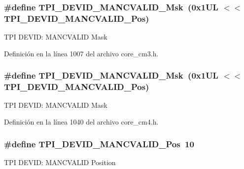 \subsubsection[{\texorpdfstring{T\+P\+I\+\_\+\+D\+E\+V\+I\+D\+\_\+\+M\+A\+N\+C\+V\+A\+L\+I\+D\+\_\+\+Msk}{TPI_DEVID_MANCVALID_Msk}}]{\setlength{\rightskip}{0pt plus 5cm}\#define T\+P\+I\+\_\+\+D\+E\+V\+I\+D\+\_\+\+M\+A\+N\+C\+V\+A\+L\+I\+D\+\_\+\+Msk~(0x1\+U\+L $<$$<$ T\+P\+I\+\_\+\+D\+E\+V\+I\+D\+\_\+\+M\+A\+N\+C\+V\+A\+L\+I\+D\+\_\+\+Pos)}\hypertarget{group___c_m_s_i_s___t_p_i_ga4c3ee4b1a34ad1960a6b2d6e7e0ff942}{}\label{group___c_m_s_i_s___t_p_i_ga4c3ee4b1a34ad1960a6b2d6e7e0ff942}
T\+PI D\+E\+V\+ID\+: M\+A\+N\+C\+V\+A\+L\+ID Mask 

Definición en la línea 1007 del archivo core\+\_\+cm3.\+h.

\subsubsection[{\texorpdfstring{T\+P\+I\+\_\+\+D\+E\+V\+I\+D\+\_\+\+M\+A\+N\+C\+V\+A\+L\+I\+D\+\_\+\+Msk}{TPI_DEVID_MANCVALID_Msk}}]{\setlength{\rightskip}{0pt plus 5cm}\#define T\+P\+I\+\_\+\+D\+E\+V\+I\+D\+\_\+\+M\+A\+N\+C\+V\+A\+L\+I\+D\+\_\+\+Msk~(0x1\+U\+L $<$$<$ T\+P\+I\+\_\+\+D\+E\+V\+I\+D\+\_\+\+M\+A\+N\+C\+V\+A\+L\+I\+D\+\_\+\+Pos)}\hypertarget{group___c_m_s_i_s___t_p_i_ga4c3ee4b1a34ad1960a6b2d6e7e0ff942}{}\label{group___c_m_s_i_s___t_p_i_ga4c3ee4b1a34ad1960a6b2d6e7e0ff942}
T\+PI D\+E\+V\+ID\+: M\+A\+N\+C\+V\+A\+L\+ID Mask 

Definición en la línea 1040 del archivo core\+\_\+cm4.\+h.

\subsubsection[{\texorpdfstring{T\+P\+I\+\_\+\+D\+E\+V\+I\+D\+\_\+\+M\+A\+N\+C\+V\+A\+L\+I\+D\+\_\+\+Pos}{TPI_DEVID_MANCVALID_Pos}}]{\setlength{\rightskip}{0pt plus 5cm}\#define T\+P\+I\+\_\+\+D\+E\+V\+I\+D\+\_\+\+M\+A\+N\+C\+V\+A\+L\+I\+D\+\_\+\+Pos~10}\hypertarget{group___c_m_s_i_s___t_p_i_ga675534579d9e25477bb38970e3ef973c}{}\label{group___c_m_s_i_s___t_p_i_ga675534579d9e25477bb38970e3ef973c}
T\+PI D\+E\+V\+ID\+: M\+A\+N\+C\+V\+A\+L\+ID Position 

